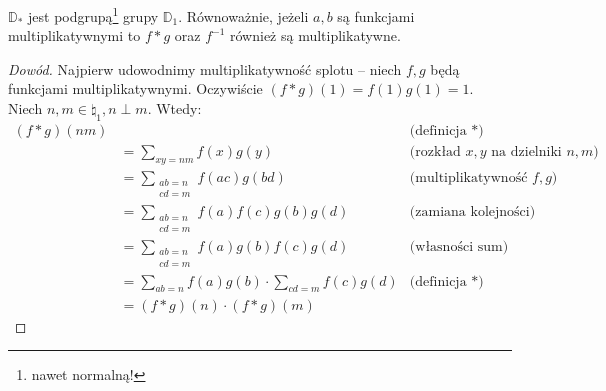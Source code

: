 \begin{theorem}
	\label{nt:dirichletmulti}
	\(\mathbb D_*\) jest podgrupą\footnote{nawet normalną!} grupy \(\mathbb D_1\).
	Równoważnie, jeżeli \(a, b\) są funkcjami multiplikatywnymi to
	\(f * g\) oraz \(f^{-1}\) również są multiplikatywne.
\end{theorem}
\begin{proof}[Dowód]
	Najpierw udowodnimy multiplikatywność splotu -- niech \(f, g\) będą funkcjami multiplikatywnymi.
	Oczywiście \((f * g)(1) = f(1)g(1) = 1\).
	Niech \(n,m \in \natural_1, n \perp m\). Wtedy:
	\begin{align*}
		(f*g)(nm) &                                                                                                                      & \text{(definicja $*$)}                      \\
		          & = \sum_{xy = nm} f(x)g(y)                                                                                            & \text{(rozkład $x, y$ na dzielniki $n, m$)} \\
		          & = \sum_{                                                                                            \substack{ab = n                                               \\ cd = m}} f(ac)g(bd)                    & \text{(multiplikatywność $f, g$)}           \\
		          & = \sum_{                                                                                            \substack{ab = n                                               \\ cd = m}} f(a)f(c)g(b)g(d)              & \text{(zamiana kolejności)}                 \\
		          & = \sum_{                                                                                            \substack{ab = n                                               \\ cd = m}} f(a)g(b)f(c)g(d)              & \text{(własności sum)}                      \\
		          & = \sum_{ab = n} f(a)g(b) \cdot \sum_{cd = m} f(c)g(d)                                                                & \text{(definicja $*$)}                      \\
		          & = (f*g)(n) \cdot (f*g)(m)
	\end{align*}


\end{proof}

